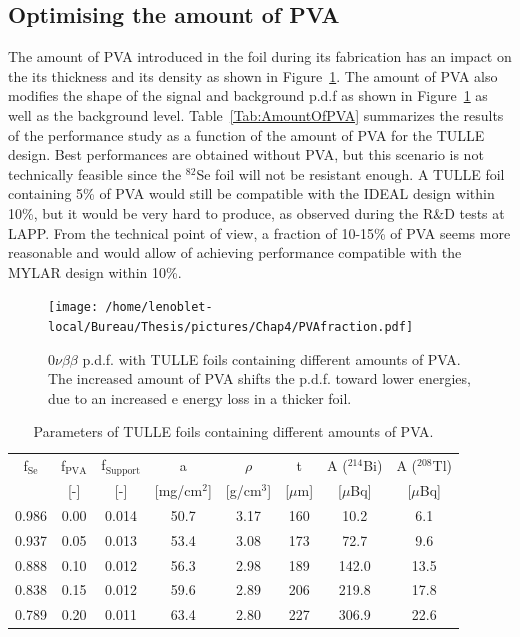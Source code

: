 \documentclass[main.tex]{subfiles}
\begin{document}
\FloatBarrier


\subsection{Optimising the amount of PVA}\label{sec:OptimisingAmountPVA}


\NI The amount of PVA introduced in the foil during its fabrication has an impact on the its thickness and its density as shown in Figure~\ref{Tab:PamameterAmountPVA}. The amount of PVA also modifies the shape of the signal and background p.d.f as shown in Figure~\ref{SpectrumPVA} as well as the background level. Table~\ref{Tab:AmountOfPVA} summarizes the results of the performance study as a function of the amount of PVA for the TULLE design. Best performances are obtained without PVA, but this scenario is not technically feasible since the $^{\text{82}}$Se foil will not be resistant enough. A TULLE foil containing 5\% of PVA would still be compatible with the IDEAL design within 10\%, but it would be very hard to produce, as observed during the R\&D tests at LAPP. From the technical point of view, a fraction of 10-15\% of PVA seems more reasonable and would allow of achieving performance compatible with the MYLAR design within 10\%.


\bigskip	


\begin{figure}[h!]
\centering
\texttt{[image: /home/lenoblet-local/Bureau/Thesis/pictures/Chap4/PVAfraction.pdf]}
\caption{0$\nu\beta\beta$ p.d.f. with TULLE foils containing different amounts of PVA. The increased amount of PVA shifts the p.d.f. toward lower energies, due to an increased e energy loss in a thicker foil.}
\label{SpectrumPVA}
\end{figure}


\begin{table}
\centering
\begin{tabular}{c|c|c|c|c|c|c|c}
\toprule 
f$_{\text{Se}}$ & f$_{\text{PVA}}$ & f$_{\text{Support}}$ & a & $\rho$ & t & A ($^{\text{214}}$Bi) & A ($^{\text{208}}$Tl) \\ [0.1cm] 
[-] & [-] & [-] & [mg/cm$^\text{2}$] & [g/cm$^\text{3}$] & [$\mu$m] & [$\mu$Bq] & [$\mu$Bq] \\[0.1cm]
\hline 
0.986 & 0.00 & 0.014 & 50.7 & 3.17 & 160 & 10.2 & 6.1 \\ [0.1cm]
\hline 
0.937 & 0.05 & 0.013 & 53.4 & 3.08 & 173 & 72.7 & 9.6 \\ [0.1cm]
\hline 
0.888 & 0.10 & 0.012 & 56.3 & 2.98 & 189 & 142.0 & 13.5 \\ [0.1cm]
\hline 
0.838 & 0.15 & 0.012 & 59.6 & 2.89 & 206 & 219.8 & 17.8 \\ [0.1cm]
\hline 
0.789 & 0.20 & 0.011 & 63.4 & 2.80 & 227 & 306.9 & 22.6 \\ [0.1cm]
\bottomrule 
\end{tabular} 
\caption{Parameters of TULLE foils containing different amounts of PVA.}
\label{Tab:PamameterAmountPVA}
\end{table}
\end{document}
